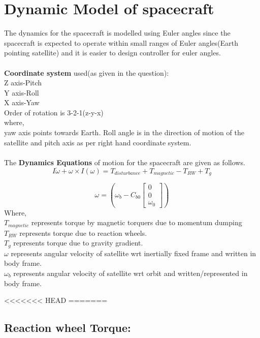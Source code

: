 \documentclass[10pt,a4paper]{report}
\begin{document}
\chapter{Dynamic Model of spacecraft}
The dynamics for the spacecraft is modelled using Euler angles since the spacecraft is expected to operate within small ranges of Euler angles(Earth pointing satellite) and it is easier to design controller for euler angles.\\ \\
\textbf{Coordinate system} used(as given in the question):\\
Z axis-Pitch\\
Y axis-Roll\\
X axis-Yaw\\
Order of rotation is 3-2-1(z-y-x)\\
where,\\
yaw axis points towards Earth. Roll angle is in the direction of motion of the satellite and pitch axis as per right hand coordinate system.
\\ \\
The \textbf{Dynamics Equations} of motion for the spacecraft are given as follows.\\
\begin{equation}
I\dot{\omega}+\omega\times I(\omega)=T_{disturbance}+T_{magnetic}-T_{RW}+T_{g}
\end{equation}

\begin{equation}
\omega=\left(\omega_{b}-C_{b0}\begin{bmatrix}
0\\0\\\omega_{0}
\end{bmatrix}\right)
\end{equation}
Where,\\
	$ T_{magnetic} $ represents torque by magnetic torquers due to momentum dumping \\
	$ T_{RW} $ represents torque due to reaction wheels.\\
	$ T_{g} $ represents torque due to gravity gradient.\\
	$ \omega $ represents angular velocity of satellite wrt inertially fixed frame and written in body frame.\\
	$ \omega_b $ represents angular velocity of satellite wrt orbit and written/represented in body frame.

<<<<<<< HEAD
=======
\section{Reaction wheel Torque:}
\end{document}
